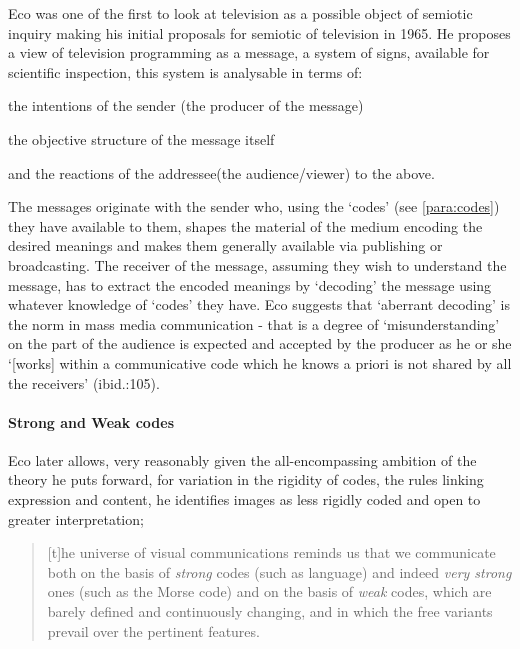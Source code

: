 Eco was one of the first to look at television as a possible object of semiotic inquiry making his initial proposals for semiotic of television in 1965. He proposes a view of television programming as a message, a system of signs, available for scientific inspection, this system is analysable in terms of:
\begin{close_enum}
\item the intentions of the sender (the producer of the message)
\item the objective structure of the message itself
\item and the reactions of the addressee(the audience/viewer) to the above.\\
\citep[104]{Eco:1965}
\end{close_enum}

The messages originate with the sender who, using the `codes' (see \ref{para:codes}) they have available to them, shapes the material of the medium encoding the desired meanings and makes them generally available via publishing or broadcasting. The receiver of the message, assuming they wish to understand the message, has to extract the encoded meanings by `decoding' the message using whatever knowledge of `codes' they have. Eco suggests that `aberrant decoding' is the norm in mass media communication - that is a degree of `misunderstanding' on the part of the audience is expected and accepted by the producer as he or she `[works] within a communicative code which he knows a priori is not shared by all the receivers' (ibid.:105). 

\paragraph{Strong and Weak codes} Eco later allows, very reasonably given the all-encompassing ambition of the theory he puts forward, for variation in the rigidity of codes, the rules linking expression and content, he identifies images as less rigidly coded and open to greater interpretation; 

\begin{quote}%
[t]he universe of visual communications reminds us that we communicate both on the basis of \textit{strong} codes (such as language) and indeed \textit{very strong} ones (such as the Morse code) and on the basis of \textit{weak} codes, which are barely defined and continuously changing, and in which the free variants prevail over the pertinent features. \citep[214]{Eco:1976}
\end{quote}

